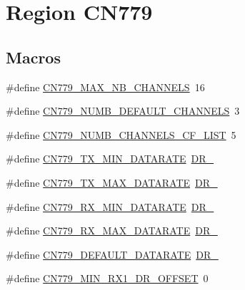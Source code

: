 \hypertarget{group__REGIONCN779}{}\section{Region C\+N779}
\label{group__REGIONCN779}
\subsection*{Macros}
\begin{DoxyCompactItemize}
\item 
\#define \hyperlink{group__REGIONCN779_gaa23230e648a8147840e88f03f9d3b7fc}{C\+N779\+\_\+\+M\+A\+X\+\_\+\+N\+B\+\_\+\+C\+H\+A\+N\+N\+E\+LS}~16
\item 
\#define \hyperlink{group__REGIONCN779_ga03a2c79e3c0f039e5f1150e4d9fdfa1a}{C\+N779\+\_\+\+N\+U\+M\+B\+\_\+\+D\+E\+F\+A\+U\+L\+T\+\_\+\+C\+H\+A\+N\+N\+E\+LS}~3
\item 
\#define \hyperlink{group__REGIONCN779_ga89f42e14e70be48170465e9cdd74caeb}{C\+N779\+\_\+\+N\+U\+M\+B\+\_\+\+C\+H\+A\+N\+N\+E\+L\+S\+\_\+\+C\+F\+\_\+\+L\+I\+ST}~5
\item 
\#define \hyperlink{group__REGIONCN779_ga78e9e4ce4dd6df844573865d9de7e268}{C\+N779\+\_\+\+T\+X\+\_\+\+M\+I\+N\+\_\+\+D\+A\+T\+A\+R\+A\+TE}~\hyperlink{group__REGION_ga6c4ef966b4f3d5eb7597b087f2b97095}{D\+R\+\_}
\item 
\#define \hyperlink{group__REGIONCN779_gabc1992b9207de536e7b92f2d51e6b7e4}{C\+N779\+\_\+\+T\+X\+\_\+\+M\+A\+X\+\_\+\+D\+A\+T\+A\+R\+A\+TE}~\hyperlink{group__REGION_ga3a06805baf4f00911a3a5d3dbadebf61}{D\+R\+\_}
\item 
\#define \hyperlink{group__REGIONCN779_ga9b8a3086475f37d72484e75a4bf8f4a5}{C\+N779\+\_\+\+R\+X\+\_\+\+M\+I\+N\+\_\+\+D\+A\+T\+A\+R\+A\+TE}~\hyperlink{group__REGION_ga6c4ef966b4f3d5eb7597b087f2b97095}{D\+R\+\_}
\item 
\#define \hyperlink{group__REGIONCN779_ga89261ba0eddf04555c7a38fff0dff2d6}{C\+N779\+\_\+\+R\+X\+\_\+\+M\+A\+X\+\_\+\+D\+A\+T\+A\+R\+A\+TE}~\hyperlink{group__REGION_ga3a06805baf4f00911a3a5d3dbadebf61}{D\+R\+\_}
\item 
\#define \hyperlink{group__REGIONCN779_ga442dfac2a5611f9e14fb748376e99b3e}{C\+N779\+\_\+\+D\+E\+F\+A\+U\+L\+T\+\_\+\+D\+A\+T\+A\+R\+A\+TE}~\hyperlink{group__REGION_ga6c4ef966b4f3d5eb7597b087f2b97095}{D\+R\+\_}
\item 
\#define \hyperlink{group__REGIONCN779_gae0ef3405f8d33d4b21e74588b50c2569}{C\+N779\+\_\+\+M\+I\+N\+\_\+\+R\+X1\+\_\+\+D\+R\+\_\+\+O\+F\+F\+S\+ET}~0

\end{DoxyCompactItemize}
